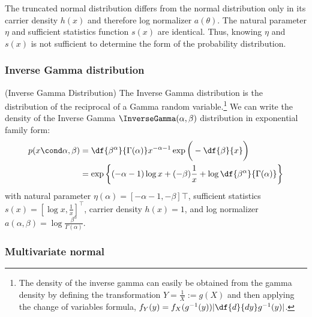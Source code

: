 \documentclass{article} %
\newcommand{\logNormalizerFunction}{a}
\newcommand{\sufficientStatsFunction}{s}
\newcommand{\carrierDensity}{h}
\newcommand{\param}{\theta}
\newcommand{\naturalParam}{\eta}
\begin{document}
\begin{remark}
The truncated normal distribution differs from the normal distribution only in its carrier density $\carrierDensity(x)$ and therefore log normalizer $\logNormalizerFunction(\param)$.  The natural parameter $\naturalParam$ and sufficient statistics function $\sufficientStatsFunction(x)$ are identical.   Thus,  knowing $\naturalParam$ and $\sufficientStatsFunction(x)$ is not sufficient to determine the form of the probability distribution.
\label{rk:truncated_normal_differs_from_normal_only_in_terms_of_carrier_density}
\end{remark}


\subsubsection{Inverse Gamma distribution}

\begin{example}{(Inverse Gamma Distribution)} 
\label{ex:inverse_gamma_as_ef} The Inverse Gamma distribution is the distribution of the reciprocal of a Gamma random variable.\footnote{The density of the inverse gamma can easily be obtained from the gamma density by defining the transformation $Y = \frac{1}{X} := g(X)$ and then applying the change of variables formula,  $f_Y(y) = f_X (g^{-1}(y)) | \df{d}{dy} g^{-1}(y)|$.}  We can write the density of the Inverse Gamma $\InverseGamma(\alpha,  \beta)$ distribution in exponential family form:
\begin{align*}
p (x \cond \alpha,  \beta) &= \df{\beta^\alpha}{ \Gamma (\alpha) } x^{-\alpha -1} \exp \bigg(- \df{\beta}{x} \bigg) \\
&= \exp \bigg\{ (-\alpha - 1) \log x + (- \beta) \frac{1}{x} + \log \df{\beta^\alpha}{\Gamma(\alpha)} \bigg\}
\end{align*}
with natural parameter $\naturalParam(\alpha) = [-\alpha-1,  -\beta]\top$, sufficient statistics $\sufficientStatsFunction(x) = [\log x ,  \frac{1}{x}]^\top$, carrier density $\carrierDensity(x)=1$, and log normalizer $a(\alpha,  \beta) =  \log \frac{\beta^\alpha}{\Gamma(\alpha)} $. 
  
\end{example} 

\subsubsection{Multivariate normal}
\end{document}
